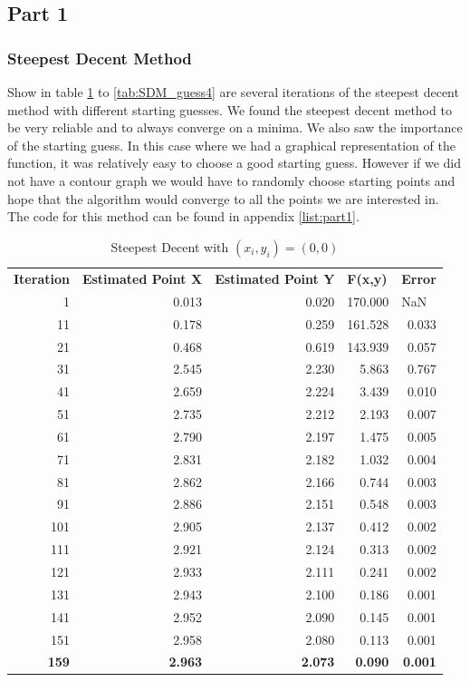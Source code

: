\documentclass[12pt]{article}
\begin{document}
\subsection{Part 1}
\subsubsection{Steepest Decent Method}
Show in table \ref{tab:SDM_guess1} to \ref{tab:SDM_guess4} are several iterations of the steepest decent method with different starting guesses. We found the steepest decent method to be very reliable and to always converge on a minima. We also saw the importance of the starting guess. In this case where we had a graphical representation of the function, it was relatively easy to choose a good starting guess. However if we did not have a contour graph we would have to randomly choose starting points and hope that the algorithm would converge to all the points we are interested in. The code for this method can be found in appendix \ref{list:part1}.
\begin{table}[h!]
  \centering
  \caption{Steepest Decent with $(x_i,y_i) = (0,0)$}
    \begin{tabular}{rrrrr}
    \multicolumn{1}{l}{\textbf{Iteration}} & \multicolumn{1}{l}{\textbf{Estimated Point X}} & \multicolumn{1}{l}{\textbf{Estimated Point Y}} & \multicolumn{1}{l}{\textbf{F(x,y)}} & \multicolumn{1}{l}{\textbf{Error}} \\
    1     & 0.013 & 0.020 & 170.000 & \multicolumn{1}{l}{NaN} \\
    11    & 0.178 & 0.259 & 161.528 & 0.033 \\
    21    & 0.468 & 0.619 & 143.939 & 0.057 \\
    31    & 2.545 & 2.230 & 5.863 & 0.767 \\
    41    & 2.659 & 2.224 & 3.439 & 0.010 \\
    51    & 2.735 & 2.212 & 2.193 & 0.007 \\
    61    & 2.790 & 2.197 & 1.475 & 0.005 \\
    71    & 2.831 & 2.182 & 1.032 & 0.004 \\
    81    & 2.862 & 2.166 & 0.744 & 0.003 \\
    91    & 2.886 & 2.151 & 0.548 & 0.003 \\
    101   & 2.905 & 2.137 & 0.412 & 0.002 \\
    111   & 2.921 & 2.124 & 0.313 & 0.002 \\
    121   & 2.933 & 2.111 & 0.241 & 0.002 \\
    131   & 2.943 & 2.100 & 0.186 & 0.001 \\
    141   & 2.952 & 2.090 & 0.145 & 0.001 \\
    151   & 2.958 & 2.080 & 0.113 & 0.001 \\
    \textbf{159} & \textbf{2.963} & \textbf{2.073} & \textbf{0.090} & \textbf{0.001} \\
    \end{tabular}%
  \label{tab:SDM_guess1}%
\end{table}%
\end{document}
